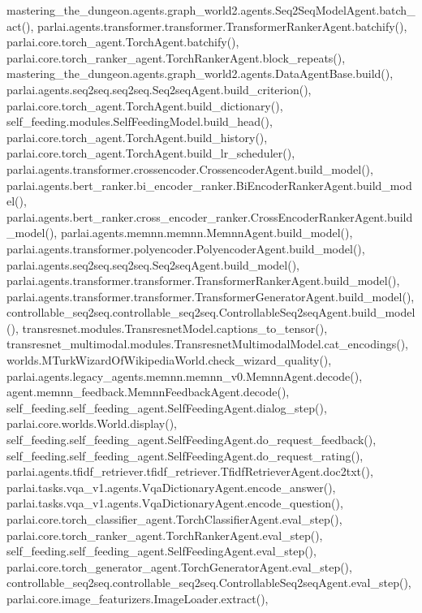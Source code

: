 mastering\+\_\+the\+\_\+dungeon.\+agents.\+graph\+\_\+world2.\+agents.\+Seq2\+Seq\+Model\+Agent.\+batch\+\_\+act(), parlai.\+agents.\+transformer.\+transformer.\+Transformer\+Ranker\+Agent.\+batchify(), parlai.\+core.\+torch\+\_\+agent.\+Torch\+Agent.\+batchify(), parlai.\+core.\+torch\+\_\+ranker\+\_\+agent.\+Torch\+Ranker\+Agent.\+block\+\_\+repeats(), mastering\+\_\+the\+\_\+dungeon.\+agents.\+graph\+\_\+world2.\+agents.\+Data\+Agent\+Base.\+build(), parlai.\+agents.\+seq2seq.\+seq2seq.\+Seq2seq\+Agent.\+build\+\_\+criterion(), parlai.\+core.\+torch\+\_\+agent.\+Torch\+Agent.\+build\+\_\+dictionary(), self\+\_\+feeding.\+modules.\+Self\+Feeding\+Model.\+build\+\_\+head(), parlai.\+core.\+torch\+\_\+agent.\+Torch\+Agent.\+build\+\_\+history(), parlai.\+core.\+torch\+\_\+agent.\+Torch\+Agent.\+build\+\_\+lr\+\_\+scheduler(), parlai.\+agents.\+transformer.\+crossencoder.\+Crossencoder\+Agent.\+build\+\_\+model(), parlai.\+agents.\+bert\+\_\+ranker.\+bi\+\_\+encoder\+\_\+ranker.\+Bi\+Encoder\+Ranker\+Agent.\+build\+\_\+model(), parlai.\+agents.\+bert\+\_\+ranker.\+cross\+\_\+encoder\+\_\+ranker.\+Cross\+Encoder\+Ranker\+Agent.\+build\+\_\+model(), parlai.\+agents.\+memnn.\+memnn.\+Memnn\+Agent.\+build\+\_\+model(), parlai.\+agents.\+transformer.\+polyencoder.\+Polyencoder\+Agent.\+build\+\_\+model(), parlai.\+agents.\+seq2seq.\+seq2seq.\+Seq2seq\+Agent.\+build\+\_\+model(), parlai.\+agents.\+transformer.\+transformer.\+Transformer\+Ranker\+Agent.\+build\+\_\+model(), parlai.\+agents.\+transformer.\+transformer.\+Transformer\+Generator\+Agent.\+build\+\_\+model(), controllable\+\_\+seq2seq.\+controllable\+\_\+seq2seq.\+Controllable\+Seq2seq\+Agent.\+build\+\_\+model(), transresnet.\+modules.\+Transresnet\+Model.\+captions\+\_\+to\+\_\+tensor(), transresnet\+\_\+multimodal.\+modules.\+Transresnet\+Multimodal\+Model.\+cat\+\_\+encodings(), worlds.\+M\+Turk\+Wizard\+Of\+Wikipedia\+World.\+check\+\_\+wizard\+\_\+quality(), parlai.\+agents.\+legacy\+\_\+agents.\+memnn.\+memnn\+\_\+v0.\+Memnn\+Agent.\+decode(), agent.\+memnn\+\_\+feedback.\+Memnn\+Feedback\+Agent.\+decode(), self\+\_\+feeding.\+self\+\_\+feeding\+\_\+agent.\+Self\+Feeding\+Agent.\+dialog\+\_\+step(), parlai.\+core.\+worlds.\+World.\+display(), self\+\_\+feeding.\+self\+\_\+feeding\+\_\+agent.\+Self\+Feeding\+Agent.\+do\+\_\+request\+\_\+feedback(), self\+\_\+feeding.\+self\+\_\+feeding\+\_\+agent.\+Self\+Feeding\+Agent.\+do\+\_\+request\+\_\+rating(), parlai.\+agents.\+tfidf\+\_\+retriever.\+tfidf\+\_\+retriever.\+Tfidf\+Retriever\+Agent.\+doc2txt(), parlai.\+tasks.\+vqa\+\_\+v1.\+agents.\+Vqa\+Dictionary\+Agent.\+encode\+\_\+answer(), parlai.\+tasks.\+vqa\+\_\+v1.\+agents.\+Vqa\+Dictionary\+Agent.\+encode\+\_\+question(), parlai.\+core.\+torch\+\_\+classifier\+\_\+agent.\+Torch\+Classifier\+Agent.\+eval\+\_\+step(), parlai.\+core.\+torch\+\_\+ranker\+\_\+agent.\+Torch\+Ranker\+Agent.\+eval\+\_\+step(), self\+\_\+feeding.\+self\+\_\+feeding\+\_\+agent.\+Self\+Feeding\+Agent.\+eval\+\_\+step(), parlai.\+core.\+torch\+\_\+generator\+\_\+agent.\+Torch\+Generator\+Agent.\+eval\+\_\+step(), controllable\+\_\+seq2seq.\+controllable\+\_\+seq2seq.\+Controllable\+Seq2seq\+Agent.\+eval\+\_\+step(), parlai.\+core.\+image\+\_\+featurizers.\+Image\+Loader.\+extract(), 